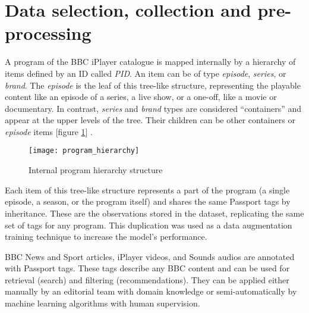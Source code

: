 
\section{Data selection, collection and pre-processing}


A program of the BBC iPlayer catalogue is mapped internally by a hierarchy of items defined by an ID called \textit{PID}.
An item can be of type \textit{episode}, \textit{series}, or \textit{brand}. The \textit{episode} is the leaf of this tree-like structure,
representing the playable content like an episode of a series, a live show, or a one-off, like a movie or documentary.
In contrast, \textit{series} and \textit{brand} types are considered ``containers'' and appear at the upper levels of the tree.
Their children can be other containers or \textit{episode} items [figure \ref{fig:program_hierarchy}] \cite{BBC:ProgrammePages,BBC:ProgrammeUrlStructure}.

\begin{figure}[h]
  \centering
  \texttt{[image: program\_hierarchy]}
  \caption{Internal program hierarchy structure}
  \label{fig:program_hierarchy}
\end{figure}

Each item of this tree-like structure represents a part of the program
(a single episode, a season, or the program itself) and shares the same Passport tags by inheritance.
These are the observations stored in the dataset, replicating the same set of tags for any program.
This duplication was used as a data augmentation training technique to increase the model's performance.

BBC News and Sport articles, iPlayer videos, and Sounds audios are annotated with Passport tags.
These tags describe any BBC content and can be used for retrieval (search) and filtering (recommendations).
They can be applied either manually by an editorial team with domain knowledge
or semi-automatically by machine learning algorithms with human supervision.

